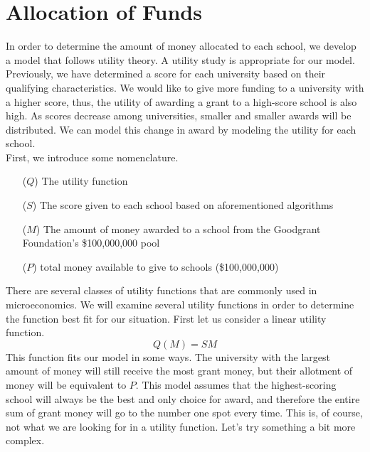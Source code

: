\documentclass[paper.tex]{subfiles}
\begin{document}
	\section{Allocation of Funds}
	
	In order to determine the amount of money allocated to each school, we develop a model that follows utility theory. A utility study is appropriate for our model. Previously, we have determined a score for each university based on their qualifying characteristics. We would like to give more funding to a university with a higher score, thus, the utility of awarding a grant to a high-score school is also high. As scores decrease among universities, smaller and smaller awards will be distributed. We can model this change in award by modeling the utility for each school.
	\\
	
	First, we introduce some nomenclature.
	\begin{itemize}
		\item[($Q$)] The utility function
		\item[($S$)] The score given to each school based on aforementioned algorithms
		\item[($M$)] The amount of money awarded to a school from the Goodgrant Foundation's \$100,000,000 pool
		\item[($P$)] total money available to give to schools (\$100,000,000)
	\end{itemize}
	There are several classes of utility functions that are commonly used in microeconomics. We will examine several utility functions in order to determine the function best fit for our situation. First let us consider a linear utility function.
	$$ Q(M) = SM $$
	This function fits our model in some ways. The university with the largest amount of money will still receive the most grant money, but their allotment of money will be equivalent to $P$. This model assumes that the highest-scoring school will always be the best and only choice for award, and therefore the entire sum of grant money will go to the number one spot every time. This is, of course, not what we are looking for in a utility function. Let's try something a bit more complex.
	\\
	
\end{document}
